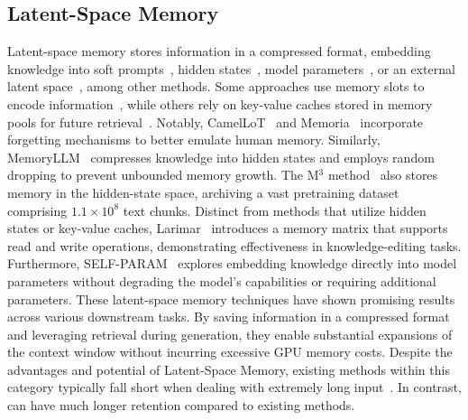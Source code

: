 \vspace{-5pt}
\subsection{Latent-Space Memory}
Latent-space memory stores information in a compressed format, embedding knowledge into soft prompts~\citep{rakotonirina2024memoryprompt}, hidden states~\citep{kNNLM, RMT, bulatov2023scaling, memoryllm}, model parameters~\citep{self-param}, or an external latent space~\citep{larimar}, among other methods. Some approaches use memory slots to encode information~\citep{al2021memory}, while others rely on key-value caches stored in memory pools for future retrieval~\citep{MemoringTransformers, LongMEM, he2024camelot, Memoria}. Notably, CamelLoT~\citep{he2024camelot} and Memoria~\citep{Memoria} incorporate forgetting mechanisms to better emulate human memory. Similarly, MemoryLLM~\citep{memoryllm} compresses knowledge into hidden states and employs random dropping to prevent unbounded memory growth. The M$^3$ method~\citep{memory3} also stores memory in the hidden-state space, archiving a vast pretraining dataset comprising $1.1\times 10^8$ text chunks. Distinct from methods that utilize hidden states or key-value caches, Larimar~\citep{larimar} introduces a memory matrix that supports read and write operations, demonstrating effectiveness in knowledge-editing tasks. Furthermore, SELF-PARAM~\citep{self-param} explores embedding knowledge directly into model parameters without degrading the model's capabilities or requiring additional parameters. These latent-space memory techniques have shown promising results across various downstream tasks. By saving information in a compressed format and leveraging retrieval during generation, they enable substantial expansions of the context window without incurring excessive GPU memory costs.
Despite the advantages and potential of Latent-Space Memory, existing methods within this category typically fall short when dealing with extremely long input~\citep{larimar,self-param,memoryllm,he2024camelot}. In contrast, \ours can have much longer retention compared to existing methods.


